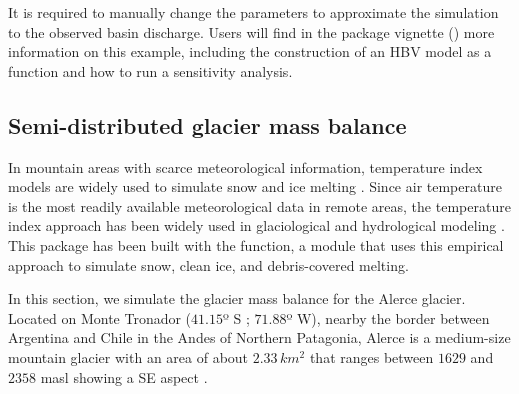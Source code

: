 It is required to manually change the  parameters to approximate the simulation to the observed basin
discharge. Users will find in the package vignette () more information on this example,
including the construction of an HBV model as a function and how to run a sensitivity analysis.


\subsection{Semi-distributed glacier mass balance}

In mountain areas with scarce meteorological information, temperature index models are widely used to simulate snow 
and ice melting \citep{hock:2003, konz:2010, finger:2015, ayala:2017}. Since air temperature is the most readily available
meteorological data in remote areas, the temperature index approach has been widely used in glaciological and hydrological
modeling \citep{ohmura:2001}. This package has been built with the  function, a module that uses
this empirical approach to simulate snow, clean ice, and debris-covered melting.

In this section, we simulate the glacier mass balance for the Alerce glacier. Located on Monte Tronador ($41.15$º S ; $71.88$º W),
nearby the border between Argentina and Chile in the Andes of Northern Patagonia, Alerce is a medium-size mountain glacier 
with an area of about $2.33 \, km^2$ that ranges between $1629$ and $2358$ masl showing a SE aspect 
\citep{ruiz:2017, ingmanso:2018}.

